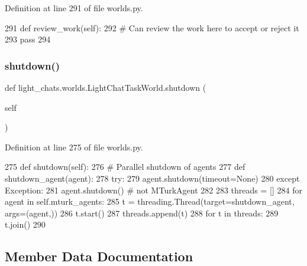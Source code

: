 Definition at line 291 of file worlds.\+py.


\begin{DoxyCode}
291     \textcolor{keyword}{def }review\_work(self):
292         \textcolor{comment}{# Can review the work here to accept or reject it}
293         \textcolor{keywordflow}{pass}
294 
\end{DoxyCode}
\mbox{\label{classlight__chats_1_1worlds_1_1LightChatTaskWorld_aefa85361e9fb431d0494a2a343028554}} 
\subsubsection{\texorpdfstring{shutdown()}{shutdown()}}
{\footnotesize\ttfamily def light\+\_\+chats.\+worlds.\+Light\+Chat\+Task\+World.\+shutdown (\begin{DoxyParamCaption}\item[{}]{self }\end{DoxyParamCaption})}



Definition at line 275 of file worlds.\+py.


\begin{DoxyCode}
275     \textcolor{keyword}{def }shutdown(self):
276         \textcolor{comment}{# Parallel shutdown of agents}
277         \textcolor{keyword}{def }shutdown\_agent(agent):
278             \textcolor{keywordflow}{try}:
279                 agent.shutdown(timeout=\textcolor{keywordtype}{None})
280             \textcolor{keywordflow}{except} Exception:
281                 agent.shutdown()  \textcolor{comment}{# not MTurkAgent}
282 
283         threads = []
284         \textcolor{keywordflow}{for} agent \textcolor{keywordflow}{in} self.mturk\_agents:
285             t = threading.Thread(target=shutdown\_agent, args=(agent,))
286             t.start()
287             threads.append(t)
288         \textcolor{keywordflow}{for} t \textcolor{keywordflow}{in} threads:
289             t.join()
290 
\end{DoxyCode}


\subsection{Member Data Documentation}
\mbox{\label{classlight__chats_1_1worlds_1_1LightChatTaskWorld_a2b2a14119080a436033495c597b6bbbf}} 
